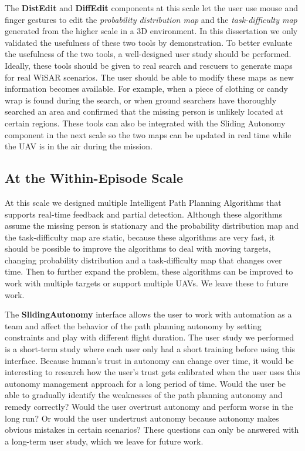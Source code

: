 The \textbf{DistEdit} and \textbf{DiffEdit} components at this scale let the user use mouse and finger gestures to edit the \textit{probability distribution map} and the \textit{task-difficulty map} generated from the higher scale in a 3D environment. In this dissertation we only validated the usefulness of these two tools by demonstration. To better evaluate the usefulness of the two tools, a well-designed user study should be performed. Ideally, these tools should be given to real search and rescuers to generate maps for real WiSAR scenarios. The user should be able to modify these maps as new information becomes available. For example, when a piece of clothing or candy wrap is found during the search, or when ground searchers have thoroughly searched an area and confirmed that the missing person is unlikely located at certain regions. These tools can also be integrated with the Sliding Autonomy component in the next scale so the two maps can be updated in real time while the UAV is in the air during the mission.

\subsection{At the Within-Episode Scale}

At this scale we designed multiple Intelligent Path Planning Algorithms that supports real-time feedback and partial detection. Although these algorithms assume the missing person is stationary and the probability distribution map and the task-difficulty map are static, because these algorithms are very fast, it should be possible to improve the algorithms to deal with moving targets, changing probability distribution and a task-difficulty map that changes over time. Then to further expand the problem, these algorithms can be improved to work with multiple targets or support multiple UAVs. We leave these to future work.

The \textbf{SlidingAutonomy} interface allows the user to work with automation as a team and affect the behavior of the path planning autonomy by setting constraints and play with different flight duration. The user study we performed is a short-term study where each user only had a short training before using this interface. Because human's trust in autonomy can change over time, it would be interesting to research how the user's trust gets calibrated when the user uses this autonomy management approach for a long period of time. Would the user be able to gradually identify the weaknesses of the path planning autonomy and remedy correctly? Would the user overtrust autonomy and perform worse in the long run? Or would the user undertrust autonomy because autonomy makes obvious mistakes in certain scenarios? These questions can only be answered with a long-term user study, which we leave for future work.

